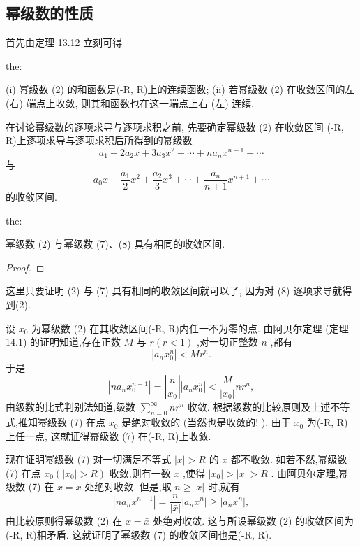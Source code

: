 \subsection{幂级数的性质}

首先由定理 13.12 立刻可得

\begin{theorem}{}{the:}

\end{theorem}
 (i) 幂级数 (2) 的和函数是(-R, R)上的连续函数; (ii) 若幂级数 (2) 在收敛区间的左 (右) 端点上收敛, 则其和函数也在这一端点上右 (左) 连续.

在讨论幂级数的逐项求导与逐项求积之前, 先要确定幂级数 (2) 在收敛区间 (-R, R)上逐项求导与逐项求积后所得到的幂级数
\[
{a}_{1} + 2{a}_{2}x + 3{a}_{3}{x}^{2} + \cdots  + n{a}_{n}{x}^{n - 1} + \cdots  \tag{7}
\]
与
\[
{a}_{0}x + \frac{{a}_{1}}{2}{x}^{2} + \frac{{a}_{2}}{3}{x}^{3} + \cdots  + \frac{{a}_{n}}{n + 1}{x}^{n + 1} + \cdots  \tag{8}
\]
的收敛区间.

\begin{theorem}{}{the:}

\end{theorem}
 幂级数 (2) 与幂级数 (7)、(8) 具有相同的收敛区间.

\begin{proof}

\end{proof}
这里只要证明 (2) 与 (7) 具有相同的收敛区间就可以了, 因为对 (8) 逐项求导就得到(2).

设 \({x}_{0}\) 为幂级数 (2) 在其收敛区间(-R, R)内任一不为零的点. 由阿贝尔定理 (定理 14.1) 的证明知道,存在正数 \(M\) 与 \(r\left( {r < 1}\right)\) ,对一切正整数 \(n\) ,都有
\[
\left| {{a}_{n}{x}_{0}^{n}}\right|  < M{r}^{n}.
\]
于是
\[
\left| {n{a}_{n}{x}_{0}^{n - 1}}\right|  = \left| \frac{n}{{x}_{0}}\right| \left| {{a}_{n}{x}_{0}^{n}}\right|  < \frac{M}{\left| {x}_{0}\right| }n{r}^{n},
\]
由级数的比式判别法知道,级数 \(\mathop{\sum }\limits_{{n = 0}}^{\infty }n{r}^{n}\) 收敛. 根据级数的比较原则及上述不等式,推知幂级数 (7) 在点 \({x}_{0}\) 是绝对收敛的 (当然也是收敛的! ). 由于 \({x}_{0}\) 为(-R, R)上任一点, 这就证得幂级数 (7) 在(-R, R)上收敛.

现在证明幂级数 (7) 对一切满足不等式 \(\left| x\right|  > R\) 的 \(x\) 都不收敛. 如若不然,幂级数 (7) 在点 \({x}_{0}\left( {\left| {x}_{0}\right|  > R}\right)\) 收敛,则有一数 \(\bar{x}\) ,使得 \(\left| {x}_{0}\right|  > \left| \bar{x}\right|  > R\) . 由阿贝尔定理,幂级数 (7) 在 \(x = \bar{x}\) 处绝对收敛. 但是,取 \(n \geq  \left| \bar{x}\right|\) 时,就有
\[
\left| {n{a}_{n}{\bar{x}}^{n - 1}}\right|  = \frac{n}{\left| \bar{x}\right| }\left| {{a}_{n}{\bar{x}}^{n}}\right|  \geq  \left| {{a}_{n}{\bar{x}}^{n}}\right| ,
\]
由比较原则得幂级数 (2) 在 \(x = \bar{x}\) 处绝对收敛. 这与所设幂级数 (2) 的收敛区间为 (-R, R)相矛盾. 这就证明了幂级数 (7) 的收敛区间也是(-R, R).

